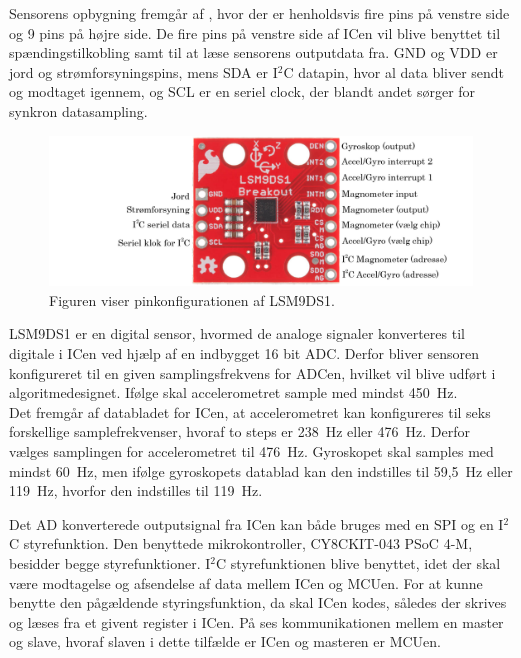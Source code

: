 Sensorens opbygning fremgår af , hvor der er henholdsvis fire pins på venstre side og 9 pins på højre side. De fire pins på venstre side af ICen vil blive benyttet til spændingstilkobling samt til at læse sensorens outputdata fra. GND og VDD er jord og strømforsyningspins, mens SDA er I$^2$C datapin, hvor al data bliver sendt og modtaget igennem, og SCL er en seriel clock, der blandt andet sørger for synkron datasampling.
\begin{figure}[H]
	\centering
	\includegraphics[scale=0.3]{figures/cDesign/accelerometeret.png}
	\caption{Figuren viser pinkonfigurationen af LSM9DS1. \citep{Jimb02016}}
	\label{fig:IC_pins}
\end{figure}

LSM9DS1 er en digital sensor, hvormed de analoge signaler konverteres til digitale i ICen ved hjælp af en indbygget 16 bit ADC. Derfor bliver sensoren konfigureret til en given samplingsfrekvens for ADCen, hvilket vil blive udført i algoritmedesignet. Ifølge  skal accelerometret sample med mindst 450~Hz.\\
Det fremgår af databladet for ICen, at accelerometret kan konfigureres til seks forskellige samplefrekvenser, hvoraf to steps er 238~Hz eller 476~Hz. Derfor vælges samplingen for accelerometret til 476~Hz. Gyroskopet skal samples med mindst 60~Hz, men ifølge gyroskopets datablad kan den indstilles til 59,5~Hz eller 119~Hz, hvorfor den indstilles til 119~Hz.

Det AD konverterede outputsignal fra ICen kan både bruges med en SPI og en I$^{2}$C styrefunktion. Den benyttede mikrokontroller, CY8CKIT-043 PSoC 4-M, besidder begge styrefunktioner. I$^{2}$C styrefunktionen blive benyttet, idet der skal være modtagelse og afsendelse af data mellem ICen og MCUen. For at kunne benytte den pågældende styringsfunktion, da skal ICen kodes, således der skrives og læses fra et givent register i ICen. På  ses kommunikationen mellem en master og slave, hvoraf slaven i dette tilfælde er ICen og masteren er MCUen. 

